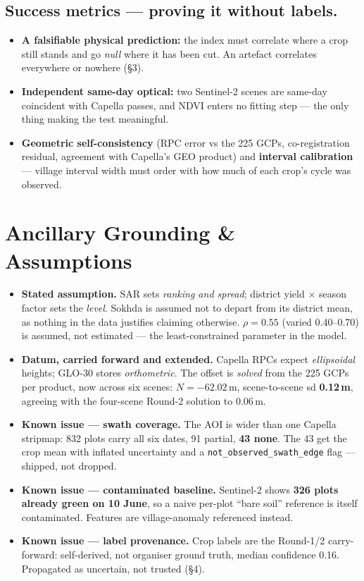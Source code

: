 \documentclass[9pt,a4paper,twocolumn]{extarticle}
\begin{document}
\subsection{Success metrics — proving it without labels.}
\begin{itemize}
\item \textbf{A falsifiable physical prediction:} the index must correlate where a crop still stands
and go \emph{null} where it has been cut. An artefact correlates everywhere or nowhere (§3).
\item \textbf{Independent same-day optical:} two Sentinel-2 scenes are same-day coincident with
Capella passes, and NDVI enters no fitting step — the only thing making the test meaningful.
\item \textbf{Geometric self-consistency} (RPC error vs the 225 GCPs, co-registration residual,
agreement with Capella's GEO product) and \textbf{interval calibration} — village interval width must
order with how much of each crop's cycle was observed.
\end{itemize}

\section{Ancillary Grounding \& Assumptions}
\begin{itemize}
\item \textbf{Stated assumption.} SAR sets \emph{ranking and spread}; district yield $\times$ season
factor sets the \emph{level}. Sokhda is assumed not to depart from its district mean, as nothing in
the data justifies claiming otherwise. $\rho=0.55$ (varied 0.40–0.70) is assumed, not estimated — the
least-constrained parameter in the model.
\item \textbf{Datum, carried forward and extended.} Capella RPCs expect \emph{ellipsoidal} heights;
GLO-30 stores \emph{orthometric}. The offset is \emph{solved} from the 225 GCPs per product, now
across six scenes: $N=-62.02$\,m, scene-to-scene sd \textbf{0.12\,m}, agreeing with the four-scene
Round-2 solution to 0.06\,m.
\item \textbf{Known issue — swath coverage.} The AOI is wider than one Capella stripmap: 832 plots
carry all six dates, 91 partial, \textbf{43 none}. The 43 get the crop mean with inflated uncertainty
and a \texttt{not\_observed\_swath\_edge} flag — shipped, not dropped.
\item \textbf{Known issue — contaminated baseline.} Sentinel-2 shows \textbf{326 plots already green
on 10 June}, so a naive per-plot ``bare soil'' reference is itself contaminated. Features are
village-anomaly referenced instead.
\item \textbf{Known issue — label provenance.} Crop labels are the Round-1/2 carry-forward:
self-derived, not organiser ground truth, median confidence 0.16. Propagated as uncertain, not
trusted (§4).
\end{itemize}
\end{document}
